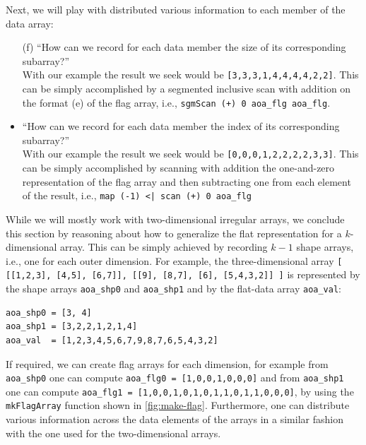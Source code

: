 \documentclass[acmsmall,review]{acmart}\settopmatter{printfolios=true,printccs=false,printacmref=false}
\begin{document}
Next, we will play with distributed various information
to each member of the data array:
\begin{itemize}
    \item[(f)] ``How can we record for each
                 data member the size of its corresponding subarray?''\\
                With our example the result we seek would be
                {\tt[3,3,3,1,4,4,4,4,2,2]}. This can be simply
                accomplished by a segmented inclusive scan with addition
                on the format (e) of the flag array, i.e.,
                \lstinline{sgmScan (+) 0 aoa_flg aoa_flg}.
   \item[(g)] ``How can we record for each
                 data member the index of its corresponding subarray?''\\
                With our example the result we seek would be
                {\tt[0,0,0,1,2,2,2,2,3,3]}. This can be simply
                accomplished by scanning with addition the
                one-and-zero representation of the flag array
                and then subtracting one from each element of
                the result, i.e., 
                \lstinline{map (-1) <| scan (+) 0 aoa_flg}
\end{itemize}

While we will mostly work with two-dimensional irregular arrays, 
we conclude this section by reasoning about how to generalize 
the flat representation for a $k$-dimensional array. This 
can be simply achieved by recording $k-1$ shape arrays,
i.e., one for each outer dimension.
For example, the three-dimensional array
{\tt [ [[1,2,3], [4,5], [6,7]], [[9], [8,7], [6], [5,4,3,2]] ]}
is represented by the shape arrays {\tt aoa\_shp0} and
{\tt aoa\_shp1} and by the flat-data array {\tt aoa\_val}:
\begin{lstlisting}[mathescape=true]
aoa_shp0 = [3, 4]
aoa_shp1 = [3,2,2,1,2,1,4]
aoa_val  = [1,2,3,4,5,6,7,9,8,7,6,5,4,3,2]
\end{lstlisting}\vspace{-2ex}
If required, we can create flag arrays for each dimension,
for example from {\tt aoa\_shp0} one can compute
{\tt aoa\_flg0 = [1,0,0,1,0,0,0]} and from {\tt aoa\_shp1}
one can compute {\tt aoa\_flg1 = [1,0,0,1,0,1,0,1,1,0,1,1,0,0,0]},
by using the {\tt mkFlagArray} function shown in \cref{fig:make-flag}.
Furthermore, one can distribute various information across the 
data elements of the arrays in a similar fashion with the one 
used for the two-dimensional arrays.   
\end{document}
